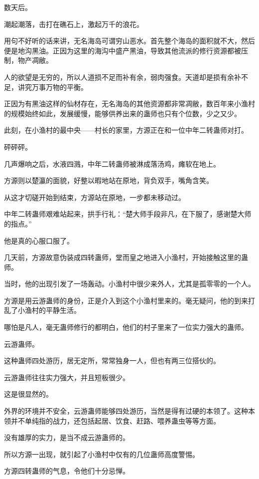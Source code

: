 
\begin{this_body}

数天后。

潮起潮落，击打在礁石上，激起万千的浪花。

用句不好听的话来讲，无名海岛可谓穷山恶水。首先整个海岛的面积就不大，然后便是地沟黑油。正因为这里的海沟中盛产黑油，导致其他流派的修行资源都被压制，物产凋敝。

人的欲望是无穷的，所以人道损不足而补有余，弱肉强食。天道却是损有余补不足，讲究万事万物的平衡。

正因为有黑油这样的仙材存在，无名海岛的其他资源都非常凋敝，数百年来小渔村的规模始终如此，发展缓慢，能够供养出来的蛊师也只有个位数，少之又少。

此刻，在小渔村的最中央——村长的家里，方源正在和一位中年二转蛊师对打。

砰砰砰。

几声爆响之后，水液四溅，中年二转蛊师被淋成落汤鸡，瘫软在地上。

方源则以楚瀛的面貌，好整以暇地站在原地，背负双手，嘴角含笑。

从这才切磋开始到结束，方源站在原地，一步都未移动过。

中年二转蛊师艰难站起来，拱手行礼：“楚大师手段非凡，在下服了，感谢楚大师的指点。”

他是真的心服口服了。

几天前，方源故意伪装成四转蛊师，堂而皇之地进入小渔村，开始接触这里的蛊师。

当时，他的出现引发了一场轰动。小渔村中很少来外人，尤其是孤零零的一个人。

方源是用云游蛊师的身份，正是介入到这个小渔村里来的。毫无疑问，他的到来打乱了小渔村的平静生活。

哪怕是凡人，毫无蛊师修行的都明白，他们的村子里来了一位实力强大的蛊师。

云游蛊师。

这种蛊师四处游历，居无定所，常常独身一人，但也有两三位搭伙的。

云游蛊师往往实力强大，并且短板很少。

这是很显然的。

外界的环境并不安全，云游蛊师能够四处游历，当然是得有过硬的本领了。这种本领并不单纯指的战力，还包括起居、饮食、赶路、喂养蛊虫等等方面。

没有雄厚的实力，是当不成云游蛊师的。

所以方源一出现，就引起了小渔村中仅有的几位蛊师高度警惕。

方源四转蛊师的气息，令他们十分忌惮。


\end{this_body}
